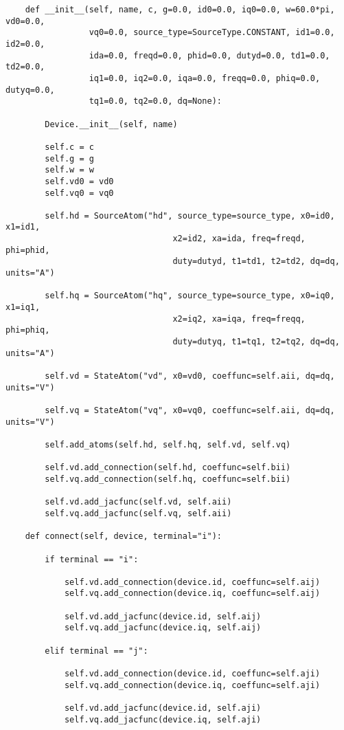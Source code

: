 \begin{lstlisting}
    def __init__(self, name, c, g=0.0, id0=0.0, iq0=0.0, w=60.0*pi, vd0=0.0,
                 vq0=0.0, source_type=SourceType.CONSTANT, id1=0.0, id2=0.0,
                 ida=0.0, freqd=0.0, phid=0.0, dutyd=0.0, td1=0.0, td2=0.0,
                 iq1=0.0, iq2=0.0, iqa=0.0, freqq=0.0, phiq=0.0, dutyq=0.0,
                 tq1=0.0, tq2=0.0, dq=None):

        Device.__init__(self, name)

        self.c = c
        self.g = g
        self.w = w
        self.vd0 = vd0
        self.vq0 = vq0

        self.hd = SourceAtom("hd", source_type=source_type, x0=id0, x1=id1,
                                  x2=id2, xa=ida, freq=freqd, phi=phid,
                                  duty=dutyd, t1=td1, t2=td2, dq=dq, units="A")

        self.hq = SourceAtom("hq", source_type=source_type, x0=iq0, x1=iq1,
                                  x2=iq2, xa=iqa, freq=freqq, phi=phiq,
                                  duty=dutyq, t1=tq1, t2=tq2, dq=dq, units="A")

        self.vd = StateAtom("vd", x0=vd0, coeffunc=self.aii, dq=dq, units="V")

        self.vq = StateAtom("vq", x0=vq0, coeffunc=self.aii, dq=dq, units="V")

        self.add_atoms(self.hd, self.hq, self.vd, self.vq)

        self.vd.add_connection(self.hd, coeffunc=self.bii)
        self.vq.add_connection(self.hq, coeffunc=self.bii)

        self.vd.add_jacfunc(self.vd, self.aii)
        self.vq.add_jacfunc(self.vq, self.aii)

    def connect(self, device, terminal="i"):

        if terminal == "i":

            self.vd.add_connection(device.id, coeffunc=self.aij)
            self.vq.add_connection(device.iq, coeffunc=self.aij)

            self.vd.add_jacfunc(device.id, self.aij)
            self.vq.add_jacfunc(device.iq, self.aij)

        elif terminal == "j":

            self.vd.add_connection(device.id, coeffunc=self.aji)
            self.vq.add_connection(device.iq, coeffunc=self.aji)

            self.vd.add_jacfunc(device.id, self.aji)
            self.vq.add_jacfunc(device.iq, self.aji)


\end{lstlisting}
